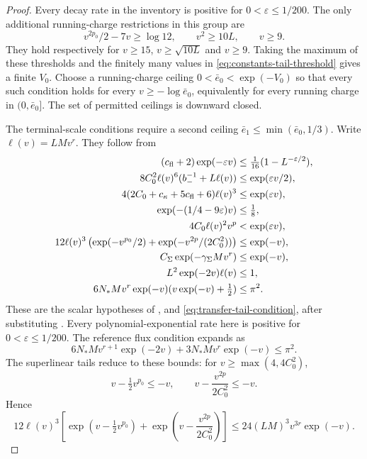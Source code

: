 \begin{proof}
Every decay rate in the inventory is positive for
$0<\varepsilon\le1/200$. The only additional
running-charge restrictions in this group are
\[
 v^{2p_0}/2-7v\ge\log12,\qquad v^2\ge10L,\qquad v\ge9.
\]
They hold respectively for $v\ge15$,
$v\ge\sqrt{10L}$ and $v\ge9$.
Taking the maximum of these thresholds and the finitely
many values in \eqref{eq:constants-tail-threshold}
gives a finite $V_0$. Choose a running-charge ceiling
$0<\bar e_0<\exp(-V_0)$ so that every such condition
holds for every $v\ge-\log \bar e_0$, equivalently for
every running charge in $(0,\bar e_0]$.
The set of permitted ceilings is downward closed.

The terminal-scale conditions require a second ceiling
$\bar e_1\le\min(\bar e_0,1/3)$. Write $\ell(v)=LMv^r$.
They follow from
\begin{align}
 (c_{\mathrm{fl}}+2)\exp(-\varepsilon v)
                      &\le\tfrac1{16}(1-L^{-\varepsilon/2}),\notag\\
 8C_0^2\ell(v)^6(b_-^{-1}+L\ell(v))
                      &\le\exp(\varepsilon v/2),\notag\\
 4(2C_0+c_\kappa+5c_{\mathrm{fl}}+6)\ell(v)^3
                      &\le\exp(\varepsilon v),\notag\\
 \exp(-(1/4-9\varepsilon)v)&\le\tfrac18,\notag\\
 4C_0\ell(v)^2v^p&<\exp(\varepsilon v),\notag\\
 12\ell(v)^3\left(\exp(-v^{p_0}/2)
                    +\exp(-v^{2p}/(2C_0^2))\right)
                      &\le\exp(-v),\notag\\
 C_\Sigma\exp(-\gamma_\Sigma Mv^r)&\le\exp(-v),\notag\\
 L^2\exp(-2v)\ell(v)&\le1,\notag\\
 6N_*Mv^r\exp(-v)(v\exp(-v)+\tfrac12)&\le\pi^2.
                                      \label{eq:constants-terminal-inventory}
\end{align}
These are the scalar hypotheses of
,
 and
\eqref{eq:transfer-tail-condition}, after substituting
.
Every polynomial-exponential rate here is positive for
$0<\varepsilon\le1/200$. The reference flux condition expands as
\[
          6N_*Mv^{r+1}\exp(-2v)+3N_*Mv^r\exp(-v)\le\pi^2.
\]
The superlinear tails reduce to these bounds:
for $v\ge\max(4,4C_0^2)$,
\[
 v-\tfrac12v^{p_0}\le-v,\qquad
 v-\frac{v^{2p}}{2C_0^2}\le-v.
\]
Hence
\[
 12\ell(v)^3
 \left[\exp\left(v-\tfrac12v^{p_0}\right)
       +\exp\left(v-\frac{v^{2p}}{2C_0^2}\right)\right]
                \le24(LM)^3v^{3r}\exp(-v).
\]
\end{proof}
